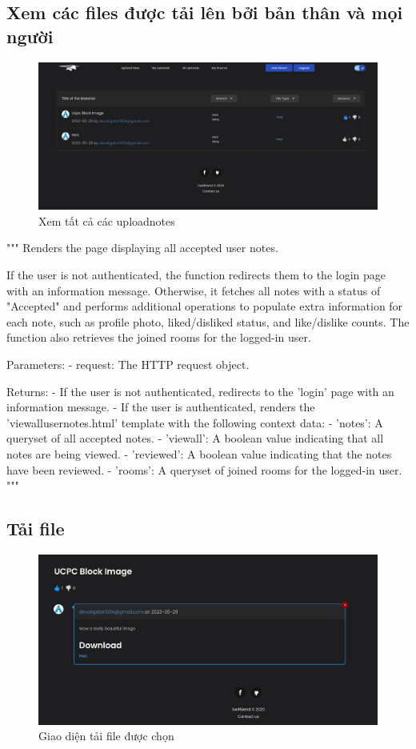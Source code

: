 \documentclass[paper=a4wide, fontsize=12pt]{scrartcl}	 %
\begin{document}
\subsection{Xem các files được tải lên bởi bản thân và mọi người}
\begin{figure}[H]
    \centering
    \includegraphics[scale=0.4]{demo/view_uploads.png}
    \caption{Xem tất cả các uploadnotes}
\end{figure}
"""
    Renders the page displaying all accepted user notes.

    If the user is not authenticated, the function redirects them to the login page with an information message.
    Otherwise, it fetches all notes with a status of "Accepted" and performs additional operations to populate
    extra information for each note, such as profile photo, liked/disliked status, and like/dislike counts.
    The function also retrieves the joined rooms for the logged-in user.

    Parameters:
    - request: The HTTP request object.

    Returns:
    - If the user is not authenticated, redirects to the 'login' page with an information message.
    - If the user is authenticated, renders the 'viewallusernotes.html' template with the following context data:
        - 'notes': A queryset of all accepted notes.
        - 'viewall': A boolean value indicating that all notes are being viewed.
        - 'reviewed': A boolean value indicating that the notes have been reviewed.
        - 'rooms': A queryset of joined rooms for the logged-in user.
    """

\subsection{Tải file}
\begin{figure}[H]
    \centering
    \includegraphics[scale=0.5]{demo/download.png}
    \caption{Giao diện tải file được chọn}
\end{figure}
\end{document}
